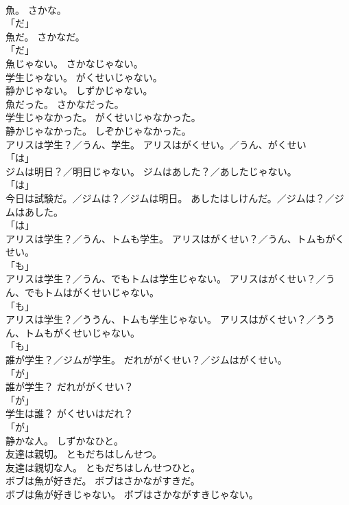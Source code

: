 \documentclass[8pt]{extreport}
\begin{document}
\begin{CJK}{UTF8}{min}
\\	魚。	さかな。	
\\	「だ」	
\\	魚だ。	さかなだ。	
\\	「だ」	
\\	魚じゃない。	さかなじゃない。	
\\	学生じゃない。	がくせいじゃない。	
\\	静かじゃない。	しずかじゃない。	
\\	魚だった。	さかなだった。	
\\	学生じゃなかった。	がくせいじゃなかった。	
\\	静かじゃなかった。	しぞかじゃなかった。	
\\	アリスは学生？／うん、学生。	アリスはがくせい。／うん、がくせい	
\\	「は」 
\\	ジムは明日？／明日じゃない。	ジムはあした？／あしたじゃない。	
\\	「は」 
\\	今日は試験だ。／ジムは？／ジムは明日。	あしたはしけんだ。／ジムは？／ジムはあした。	
\\	「は」 
\\	アリスは学生？／うん、トムも学生。	アリスはがくせい？／うん、トムもがくせい。	
\\	「も」 
\\	アリスは学生？／うん、でもトムは学生じゃない。	アリスはがくせい？／うん、でもトムはがくせいじゃない。	
\\	「も」 
\\	アリスは学生？／ううん、トムも学生じゃない。	アリスはがくせい？／ううん、トムもがくせいじゃない。	
\\	「も」 
\\	誰が学生？／ジムが学生。	だれががくせい？／ジムはがくせい。	
\\	「が」 
\\	誰が学生？	だれががくせい？	
\\	「が」 
\\	学生は誰？	がくせいはだれ？	
\\	「が」 
\\	静かな人。	しずかなひと。	
\\	友達は親切。	ともだちはしんせつ。	
\\	友達は親切な人。	ともだちはしんせつひと。	
\\	ボブは魚が好きだ。	ボブはさかながすきだ。	
\\	ボブは魚が好きじゃない。	ボブはさかながすきじゃない。	

\end{CJK}
\end{document}

